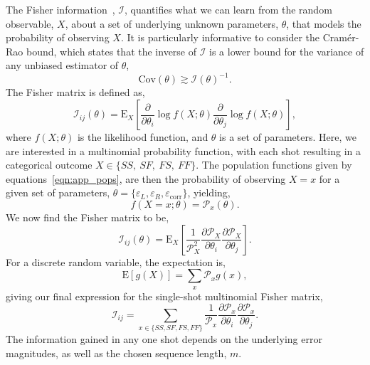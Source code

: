 The Fisher information~\cite{fisher_xxidominance_1923}, $\mathcal{I}$, quantifies what we can learn from the random observable, $X$, about a set of underlying unknown parameters, $\theta$, that models the probability of observing $X$. It is particularly informative to consider the Cram\'er-Rao bound, which states that the inverse of $\mathcal{I}$ is a lower bound for the variance of any unbiased estimator of $\theta$,
\begin{equation}
    \mathrm{Cov}(\theta)\gtrsim\mathcal{I}(\theta)^{-1}.
\end{equation}
The Fisher matrix is defined as,
\begin{equation}
    \mathcal{I}_{ij}(\theta)= \mathrm{E}_X\left[ \frac{\partial}{\partial\theta_i}\log f(X;\theta)\frac{\partial}{\partial\theta_j}\log f(X;\theta)\right],
\end{equation}
where $f(X;\theta)$ is the likelihood function, and $\theta$ is a set of parameters. Here, we are interested in a multinomial probability function, with each shot resulting in a categorical outcome $X\in\{SS,~SF,~FS,~FF\}$. The population functions given by equations~\ref{eqn:app_pops}, are then the probability of observing $X=x$ for a given set of parameters, $\theta=\{\varepsilon_{L},\varepsilon_R,\varepsilon_\mathrm{corr}\}$, yielding,
\begin{equation}
    f(X=x;\theta)=\mathcal{P}_x(\theta).
\end{equation}
We now find the Fisher matrix to be,
\begin{equation}
    \mathcal{I}_{ij}(\theta) = \mathrm{E}_X\left[\frac{1}{\mathcal{P}^2_X}\frac{\partial \mathcal{P}_X}{\partial \theta_i}\frac{\partial \mathcal{P}_X}{\partial \theta_j}\right].
\end{equation}
For a discrete random variable, the expectation is,
\begin{equation}
    \mathrm{E}[g(X)] = \sum_x \mathcal{P}_x g(x),
\end{equation}
giving our final expression for the single-shot multinomial Fisher matrix,
\begin{equation}
    \label{eqn:FI}
    \mathcal{I}_{ij} = \sum_{x\in\{SS,SF,FS,FF\}} \frac{1}{\mathcal{P}_x}\frac{\partial \mathcal{P}_x}{\partial \theta_i}\frac{\partial \mathcal{P}_x}{\partial \theta_j}.
\end{equation}
The information gained in any one shot depends on the underlying error
magnitudes, as well as the chosen sequence length, $m$. 

